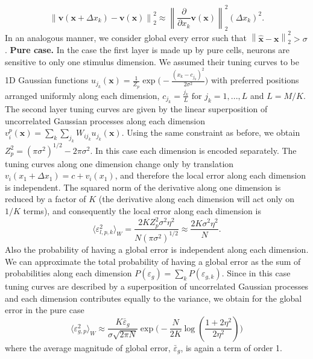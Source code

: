 \documentclass[a4paper]{article}
\begin{document}
\begin{equation}
\left\lVert \mathbf{v}(\mathbf{x} + \Delta x_k) - \mathbf{v}(\mathbf{x})\right\rVert_2^2 \approx \left\lVert \frac{\partial}{\partial x_k}\mathbf{v}(\mathbf{x})\right\rVert_2^2 (\Delta x_k)^2.
\end{equation}
In an analogous manner, we consider global every error such that $\left\lVert \hat{\mathbf{x}}-\mathbf{x}\right\rVert_2^2 > \sigma$.
\newline
\newline
\textbf{Pure case.} In the case the first layer is made up by pure cells, neurons are sensitive to only one stimulus dimension. We assumed their tuning curves to be 1D Gaussian functions \newline $u_{j_k}(\mathbf{x}) = \frac{1}{Z_p} \exp\Big(-\frac{(x_k - c_{j_k})^2}{2\sigma^2}\Big)$  with preferred positions arranged uniformly along each dimension, $c_{j_k} = \frac{j_k}{L} \text{ for } j_k=1,...,L $ and $L=M/K$. 
The second layer tuning curves are given by the linear superposition of uncorrelated Gaussian processes along each dimension $v_i^p(\mathbf{x})  =   \sum_k \sum_{j_k}W_{ij_k} u_{j_k}(\mathbf{x}).$ 
Using the same constraint as before, we obtain $Z_p^2 = (\pi \sigma^2)^{1/2} - 2\pi\sigma^2$.
In this case each dimension is encoded separately. The tuning curves along one dimension change only by translation $v_i(x_1 + \Delta x_1) = c + v_i(x_1)$, and therefore the local error along each dimension is independent. The squared norm of the derivative along one dimension is reduced by a factor of $K$ (the derivative along each dimension will act only on $1/K$ terms),  and consequently the local error along each dimension is
\begin{equation}
\langle \varepsilon_{l,p,k}^2\rangle_W = \frac{2 K Z_p^2 \sigma^2 \eta^2}{N (\pi \sigma^2)^{1/2}} \approx \frac{2 K \sigma^2 \eta^2}{N}.
\end{equation}Also the probability of having a global error is independent along each dimension. We can approximate the total probability of having a global error as the sum of probabilities along each dimension $P(\varepsilon_g) = \sum_k P(\varepsilon_{g,k})$. Since in this case tuning curves are described by a superposition of uncorrelated Gaussian processes and each dimension contributes equally to the variance, we obtain for the global error in the pure case
\begin{equation}
\langle \varepsilon_{g,p} ^2 \rangle_W \approx  \frac{K\bar{\varepsilon}_g}{\sigma\sqrt{2\pi N}} \exp{\Big(-\frac{N}{2K} \log(\frac{1+2\eta^2}{2\eta^2})\Big)}
\end{equation}where the average magnitude of global error, $\bar{\varepsilon}_g$, is again a term of order 1.
\end{document}
